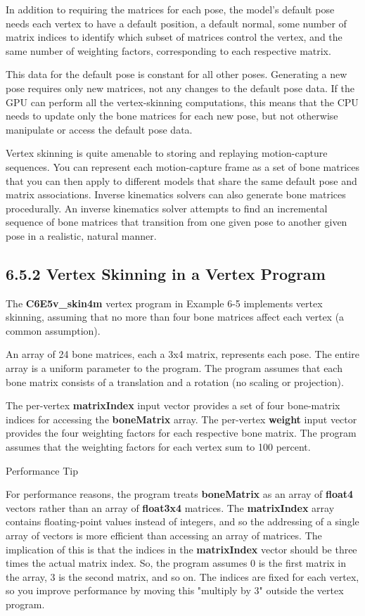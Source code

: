 \documentclass[../main.tex]{subfiles}
\begin{document}
In addition to requiring the matrices for each pose, the model's default pose needs each vertex to have a default position, a default normal, some number of matrix indices to identify which subset of matrices control the vertex, and the same number of weighting factors, corresponding to each respective matrix.

This data for the default pose is constant for all other poses. Generating a new pose requires only new matrices, not any changes to the default pose data. If the GPU can perform all the vertex-skinning computations, this means that the CPU needs to update only the bone matrices for each new pose, but not otherwise manipulate or access the default pose data.

Vertex skinning is quite amenable to storing and replaying motion-capture sequences. You can represent each motion-capture frame as a set of bone matrices that you can then apply to different models that share the same default pose and matrix associations. Inverse kinematics solvers can also generate bone matrices procedurally. An inverse kinematics solver attempts to find an incremental sequence of bone matrices that transition from one given pose to another given pose in a realistic, natural manner.

\subsection{6.5.2 Vertex Skinning in a Vertex Program}

The \textbf{C6E5v_skin4m} vertex program in Example 6-5 implements vertex skinning, assuming that no more than four bone matrices affect each vertex (a common assumption).

An array of 24 bone matrices, each a 3x4 matrix, represents each pose. The entire array is a uniform parameter to the program. The program assumes that each bone matrix consists of a translation and a rotation (no scaling or projection).

The per-vertex \textbf{matrixIndex} input vector provides a set of four bone-matrix indices for accessing the \textbf{boneMatrix} array. The per-vertex \textbf{weight} input vector provides the four weighting factors for each respective bone matrix. The program assumes that the weighting factors for each vertex sum to 100 percent.

\begin{framed}
Performance Tip

For performance reasons, the program treats \textbf{boneMatrix} as an array of \textbf{float4} vectors rather than an array of \textbf{float3x4} matrices. The \textbf{matrixIndex} array contains floating-point values instead of integers, and so the addressing of a single array of vectors is more efficient than accessing an array of matrices. The implication of this is that the indices in the \textbf{matrixIndex} vector should be three times the actual matrix index. So, the program assumes 0 is the first matrix in the array, 3 is the second matrix, and so on. The indices are fixed for each vertex, so you improve performance by moving this "multiply by 3" outside the vertex program.
\end{framed}
\end{document}
